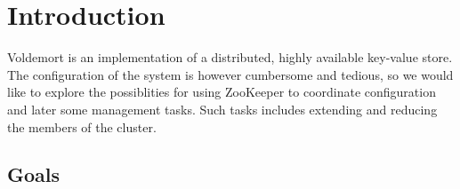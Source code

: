 
\section{Introduction}
Voldemort is an implementation of a distributed, highly available key-value store.
The configuration of the system is however cumbersome and tedious, so we would like to explore the possiblities for using ZooKeeper to coordinate configuration and later some management tasks.
Such tasks includes extending and reducing the members of the cluster.

\subsection{Goals}

\subsection{}

